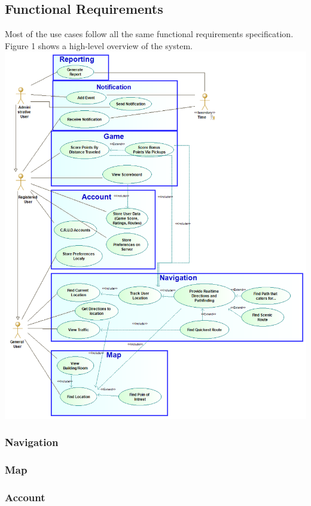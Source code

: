 \documentclass{article}
\begin{document}
    	\subsection{Functional Requirements}

    	
    	Most of the use cases follow all the same functional requirements specification. Figure 1 shows a high-level overview of the system. \\
    	\includegraphics[width=\textwidth]{System_Use_Case_Diagram}
    	
    	\subsubsection{Navigation}
    	
    	\subsubsection{Map}
    	
    	\subsubsection{Account}
    	
\end{document}
